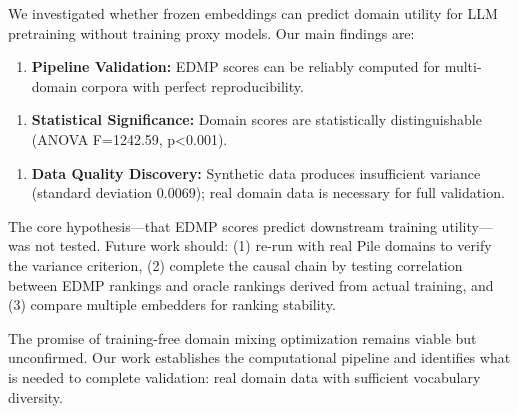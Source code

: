 
We investigated whether frozen embeddings can predict domain utility for LLM pretraining without training proxy models. Our main findings are:

\begin{enumerate}
\item \textbf{Pipeline Validation:} EDMP scores can be reliably computed for multi-domain corpora with perfect reproducibility.
\end{enumerate}

\begin{enumerate}
\item \textbf{Statistical Significance:} Domain scores are statistically distinguishable (ANOVA F=1242.59, p<0.001).
\end{enumerate}

\begin{enumerate}
\item \textbf{Data Quality Discovery:} Synthetic data produces insufficient variance (standard deviation 0.0069); real domain data is necessary for full validation.
\end{enumerate}

The core hypothesis---that EDMP scores predict downstream training utility---was not tested. Future work should: (1) re-run with real Pile domains to verify the variance criterion, (2) complete the causal chain by testing correlation between EDMP rankings and oracle rankings derived from actual training, and (3) compare multiple embedders for ranking stability.

The promise of training-free domain mixing optimization remains viable but unconfirmed. Our work establishes the computational pipeline and identifies what is needed to complete validation: real domain data with sufficient vocabulary diversity.

